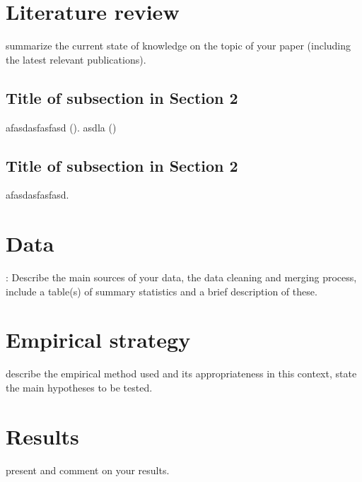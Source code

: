 \documentclass[11pt]{article}
\begin{document}
\section{Literature review}
summarize the current state of knowledge on the topic of your paper
(including the latest relevant publications).
\subsection{Title of subsection in Section 2}
afasdasfasfasd (\cite{Landrigan.2017}). asdla (\cite{Test.01012022})
\subsection{Title of subsection in Section 2}
afasdasfasfasd.
\section{Data}
: Describe the main sources of your data, the data cleaning and merging process,
include a table(s) of summary statistics and a brief description of these.
\section{Empirical strategy}
describe the empirical method used and its appropriateness in this
context, state the main hypotheses to be tested.
\section{Results}
present and comment on your results.
\end{document}
